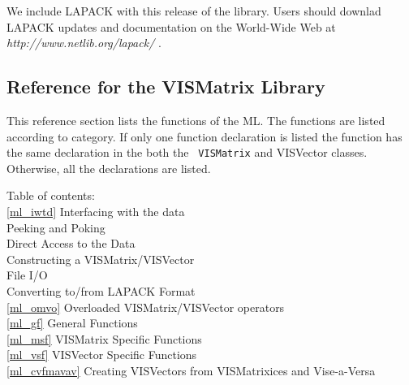 
We include LAPACK with this release of the library.
Users should downlad LAPACK updates and documentation
on the World-Wide Web at {\sl http://www.netlib.org/lapack/ }.

\subsection{Reference for the VISMatrix Library}
\label{mref}
This reference section lists the functions of the ML.  The functions 
are listed according to category.  If only one function declaration is 
listed the function has the same declaration in the both the {\tt 
VISMatrix} and VISVector classes.  Otherwise, all the declarations are 
listed.

Table of contents:\\
\hspace*{0.25in}\ref{ml_iwtd} Interfacing with the data\\
\hspace*{0.5in}Peeking and Poking\\
\hspace*{0.5in}Direct Access to the Data\\
\hspace*{0.5in}Constructing a VISMatrix/VISVector\\
\hspace*{0.5in}File I/O\\
\hspace*{0.5in}Converting to/from LAPACK Format\\
\hspace*{0.25in}\ref{ml_omvo} Overloaded VISMatrix/VISVector operators\\
\hspace*{0.25in}\ref{ml_gf} General Functions\\
\hspace*{0.25in}\ref{ml_msf} VISMatrix Specific Functions\\
\hspace*{0.25in}\ref{ml_vsf} VISVector Specific Functions\\
\hspace*{0.25in}\ref{ml_cvfmavav} Creating VISVectors from VISMatrixices and
	Vise-a-Versa\\

